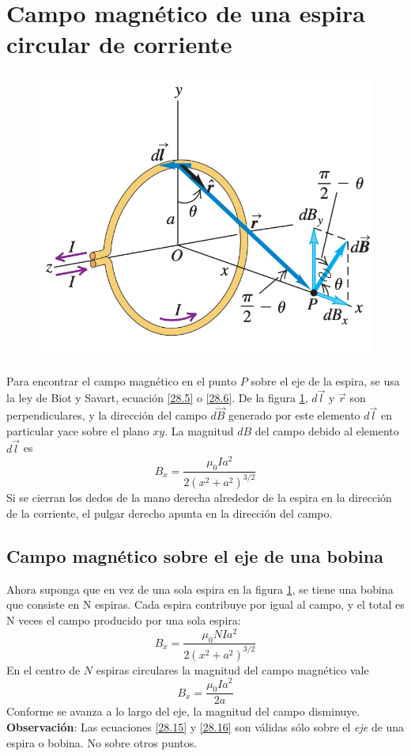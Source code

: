 \section{Campo magnético de una espira circular de corriente}
\begin{figure}[h]\label{fig3}
\includegraphics[scale=0.6]{fig/image3}
\centering
\end{figure}
Para encontrar el campo magnético en el punto $P$ sobre el eje de la espira, se usa la ley de Biot y Savart, ecuación \ref{28.5} o \ref{28.6}. De la figura \ref{fig3}, $d\vec{l}$ y $\vec{r}$ son perpendiculares, y la dirección del campo $d\vec{B}$ generado por este elemento $d\vec{l}$ en particular yace sobre el plano $xy$. La magnitud $dB$ del campo debido al elemento $d\vec{l}$ es
\begin{equation}\label{28.15}
\boxed{B_x=\frac{\mu_0Ia^2}{2(x^2+a^2)^{3/2}}}
\end{equation}
Si se cierran los dedos de la mano derecha alrededor de la espira en la dirección de la corriente, el pulgar derecho apunta en la dirección del campo.
\subsection{Campo magnético sobre el eje de una bobina}
Ahora suponga que en vez de una sola espira en la figura \ref{fig3}, se tiene una bobina que consiste en N espiras. Cada espira contribuye por igual al campo, y el total es N veces el campo producido por una sola espira:
\begin{equation}\label{28.16}
B_x=\frac{\mu_0NIa^2}{2(x^2+a^2)^{3/2}}
\end{equation}
En el centro de $N$ espiras circulares la magnitud del campo magnético vale
\begin{equation}\label{28.17}
\boxed{B_x=\frac{\mu_0Ia^2}{2a}}
\end{equation}
Conforme se avanza a lo largo del eje, la magnitud del campo disminuye.
\textbf{Observación}: Las ecuaciones \ref{28.15} y \ref{28.16} son válidas sólo sobre el \textit{eje} de una espira o bobina. No sobre otros puntos.


